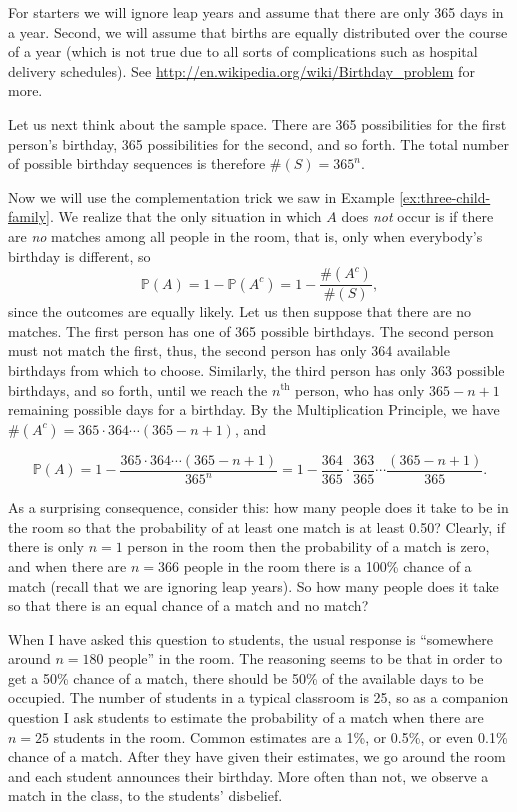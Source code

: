 \documentclass[]{book}
\numberwithin{equation}{chapter}
\numberwithin{figure}{chapter}
\theoremstyle{plain}
\theoremstyle{definition}
\theoremstyle{remark}
\theoremstyle{definition}
\theoremstyle{definition}
\theoremstyle{remark}
\begin{document}
For starters we will ignore leap years and assume that there are only
365 days in a year. Second, we will assume that births are equally
distributed over the course of a year (which is not true due to all
sorts of complications such as hospital delivery schedules). See
\url{http://en.wikipedia.org/wiki/Birthday_problem} for more.

Let us next think about the sample space. There are 365 possibilities
for the first person's birthday, 365 possibilities for the second, and
so forth. The total number of possible birthday sequences is therefore
\(\#(S)=365^{n}\).

Now we will use the complementation trick we saw in Example
\ref{ex:three-child-family}. We realize that the only situation in which
\(A\) does \emph{not} occur is if there are \emph{no} matches among all
people in the room, that is, only when everybody's birthday is
different, so \[
\mathbb{P}(A)=1-\mathbb{P}(A^{c})=1-\frac{\#(A^{c})}{\#(S)}, \] since
the outcomes are equally likely. Let us then suppose that there are no
matches. The first person has one of 365 possible birthdays. The second
person must not match the first, thus, the second person has only 364
available birthdays from which to choose. Similarly, the third person
has only 363 possible birthdays, and so forth, until we reach the
\(n^{\mathrm{th}}\) person, who has only \(365-n+1\) remaining possible
days for a birthday. By the Multiplication Principle, we have
\(\#(A^{c})=365\cdot364\cdots(365-n+1)\), and

\begin{equation}
\mathbb{P}(A)=1-\frac{365\cdot364\cdots(365-n+1)}{365^{n}}=1-\frac{364}{365}\cdot\frac{363}{365}\cdots\frac{(365-n+1)}{365}.
\end{equation}

As a surprising consequence, consider this: how many people does it take
to be in the room so that the probability of at least one match is at
least 0.50? Clearly, if there is only \(n=1\) person in the room then
the probability of a match is zero, and when there are \(n=366\) people
in the room there is a 100\% chance of a match (recall that we are
ignoring leap years). So how many people does it take so that there is
an equal chance of a match and no match?

When I have asked this question to students, the usual response is
``somewhere around \(n=180\) people'' in the room. The reasoning seems
to be that in order to get a 50\% chance of a match, there should be
50\% of the available days to be occupied. The number of students in a
typical classroom is 25, so as a companion question I ask students to
estimate the probability of a match when there are \(n=25\) students in
the room. Common estimates are a 1\%, or 0.5\%, or even 0.1\% chance of
a match. After they have given their estimates, we go around the room
and each student announces their birthday. More often than not, we
observe a match in the class, to the students' disbelief.
\end{document}
